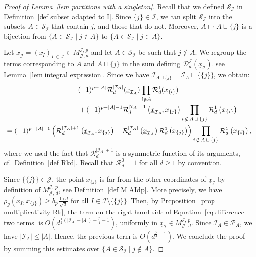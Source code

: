 \documentclass[10pt]{amsart}
\theoremstyle{definition}\newtheorem{defi}[theo]{Definition}\newtheorem{rema}[theo]{Remark}\newtheorem{exam}[theo]{Example}\newtheorem{exem}[theo]{Example}\newtheorem{nota}[theo]{Notation}
\newcommand{\D}{\mathcal{D}}
\newcommand{\I}{\mathcal{I}}
\newcommand{\J}{\mathcal{J}}
\newcommand{\clR}{\mathcal{R}}
\newcommand{\clS}{\mathcal{S}}
\newcommand{\pa}{\mathcal{P}\!}
\newcommand{\norm}[1]{\left\lvert #1 \right\rvert}
\renewcommand{\geq}{\geqslant}
\renewcommand{\leq}{\leqslant}
\begin{document}
\begin{proof}[Proof of Lemma~\ref{lem partitions with a singleton}]
Recall that we defined $\clS_\I$ in Definition~\ref{def subset adapted to I}. Since $\{j\} \in \I$, we can split $\clS_\I$ into the subsets $A \in \clS_\I$ that contain $j$, and those that do not. Moreover, $A \mapsto A \sqcup \{j\}$ is a bijection from $\{ A \in \clS_\I \mid j \notin A\}$ to $\{ A \in \clS_\I \mid j \in A\}$.

Let $\underline{x}_\I =(x_I)_{I\,\in\,\I} \in M^{\I,\,p}_{\J,\,d}$ and let $A \in \clS_\I$ be such that $j \notin A$. We regroup the terms corresponding to $A$ and $A \sqcup\{j\}$ in the sum defining $\D_d^\I(\underline{x}_\I)$, see Lemma~\ref{lem integral expression}. Since we have $\I_{A \sqcup \{j\}} = \I_A \sqcup \{\{j\}\}$, we obtain:
\begin{multline}\label{eq difference two terms}
(-1)^{p - \norm{A}} \clR_d^{\norm{\I_A}}(\underline{x}_{\I_A}) \prod_{i \notin A} \clR_d^1(x_{\{i\}})\\
\begin{aligned}
& \mkern190mu+ (-1)^{p - \norm{A}-1} \clR_d^{\norm{\I_A}+1}\left(\underline{x}_{\I_A},x_{\{j\}}\right) \prod_{i\,\notin\,A \,\sqcup\,\{j\}} \clR_d^1\left(x_{\{i\}}\right)\\
&= (-1)^{p - \norm{A}-1} \left(\clR_d^{\norm{\I_A}+1}\left(\underline{x}_{\I_A},x_{\{j\}}\right)-\clR_d^{\norm{\I_A}}\left(\underline{x}_{\I_A}\right)\clR_d^1\left(x_{\{j\}}\right)\right)\prod_{i\,\notin\,A\,\sqcup\,\{j\}} \clR_d^1\left(x_{\{i\}}\right),
\end{aligned}
\end{multline}
where we used the fact that $\clR_d^{|\I_A|+1}$ is a symmetric function of its arguments, cf.~Definition~\ref{def Rkd}. Recall that $\clR^0_d=1$ for all $d \geq 1$ by convention.

Since $\{\{j\}\} \in \J$, the point $x_{\{j\}}$ is far from the other coordinates of $\underline{x}_\I$ by definition of $M^{\I,\,p}_{\J,\,d}$, see Definition~\ref{def M AIdp}. More precisely, we have $\rho_g(x_I,x_{\{j\}}) \geq b_p \tfrac{\ln d}{\sqrt{d}}$ for all $I \in \I \setminus \{\{j\}\}$. Then, by Proposition~\ref{prop multiplicativity Rk}, the term on the right-hand side of Equation~\eqref{eq difference two terms} is $O(d^{\frac{1}{2}(|\I_A|-|A|)+ \frac{p}{4}-1})$, uniformly in $\underline{x}_\I \in M^{\I,\,p}_{\J,\,d}$. Since $\I_A \in \pa_A$, we have $|\I_A| \leq |A|$. Hence, the previous term is $O(d^{\frac{p}{4}-1})$. We conclude the proof by summing this estimates over $\{ A \in \clS_\I \mid j \notin A\}$.
\end{proof}
\end{document}
